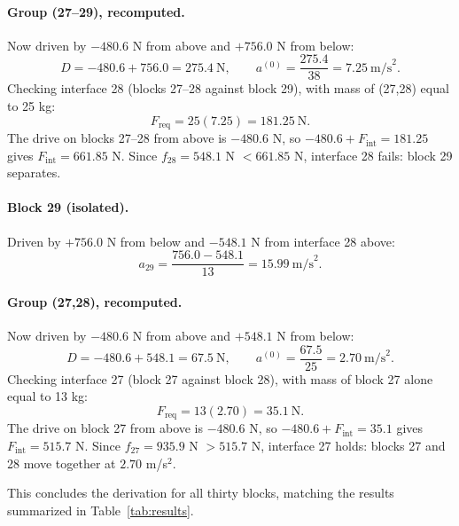 \documentclass[11pt,a4paper]{article}
\begin{document}
\paragraph{Group (27--29), recomputed.} Now driven by $-480.6$ N from above and $+756.0$ N from below:
\[
D = -480.6+756.0 = 275.4\ \text{N}, \qquad a^{(0)} = \frac{275.4}{38} = 7.25\ \text{m/s}^2 .
\]
Checking interface 28 (blocks 27--28 against block 29), with mass of (27,28) equal to 25 kg:
\[
F_{\mathrm{req}} = 25(7.25) = 181.25\ \text{N}.
\]
The drive on blocks 27--28 from above is $-480.6$ N, so $-480.6+F_{\mathrm{int}} = 181.25$ gives $F_{\mathrm{int}} = 661.85$ N. Since $f_{28}=548.1$ N $< 661.85$ N, interface 28 fails: block 29 separates.

\paragraph{Block 29 (isolated).} Driven by $+756.0$ N from below and $-548.1$ N from interface 28 above:
\[
a_{29} = \frac{756.0-548.1}{13} = 15.99\ \text{m/s}^2 .
\]

\paragraph{Group (27,28), recomputed.} Now driven by $-480.6$ N from above and $+548.1$ N from below:
\[
D = -480.6+548.1 = 67.5\ \text{N}, \qquad a^{(0)} = \frac{67.5}{25} = 2.70\ \text{m/s}^2 .
\]
Checking interface 27 (block 27 against block 28), with mass of block 27 alone equal to 13 kg:
\[
F_{\mathrm{req}} = 13(2.70) = 35.1\ \text{N}.
\]
The drive on block 27 from above is $-480.6$ N, so $-480.6+F_{\mathrm{int}} = 35.1$ gives $F_{\mathrm{int}} = 515.7$ N. Since $f_{27}=935.9$ N $> 515.7$ N, interface 27 holds: blocks 27 and 28 move together at $2.70$ m/s$^2$.

This concludes the derivation for all thirty blocks, matching the results summarized in Table~\ref{tab:results}.
\end{document}
